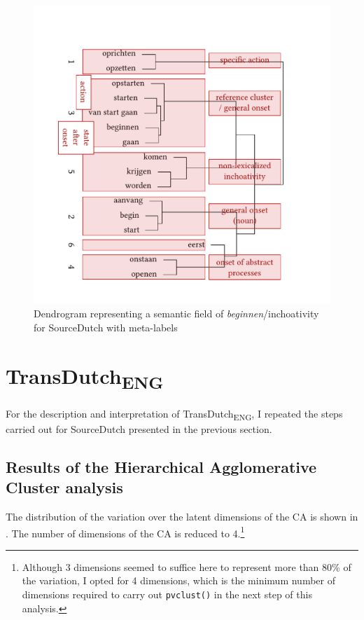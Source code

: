 \begin{figure}
\includegraphics[width=\textwidth]{figures/tree62.pdf}
\caption{\label{fig:4:61b}Dendrogram representing a semantic field of \textit{beginnen}/inchoativity for SourceDutch with meta-labels}
\end{figure}

\section{TransDutch\textsubscript{ENG}}
\label{sec:4.3}  
For the description and interpretation of TransDutch\textsubscript{ENG}, I repeated the steps carried out for SourceDutch presented in the previous section.

\subsection{Results of the Hierarchical Agglomerative Cluster analysis}
\label{sec:4.3.1}  
The distribution of the variation over the latent dimensions of the CA is shown in . The number of dimensions of the CA is reduced to 4.\footnote{Although 3 dimensions seemed to suffice here to represent more than 80\% of the variation, I opted for 4 dimensions, which is the minimum number of dimensions required to carry out \texttt{pvclust()} in the next step of this analysis.}


